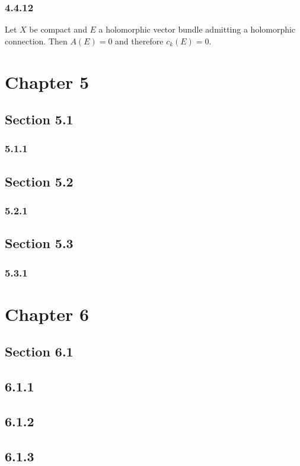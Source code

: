 \documentclass[12pt]{article}
\begin{document}
\subsubsection{4.4.12}

Let $X$ be compact \kahler and $E$ a holomorphic vector bundle admitting a holomorphic connection. Then $A(E) = 0$ and therefore $c_k(E) = 0$. 

\section{Chapter 5}

\subsection{Section 5.1}

\subsubsection{5.1.1}

\subsection{Section 5.2}

\subsubsection{5.2.1}

\subsection{Section 5.3}

\subsubsection{5.3.1}

\section{Chapter 6}

\subsection{Section 6.1}

\subsection{6.1.1}

\subsection{6.1.2}

\subsection{6.1.3}
\end{document}
